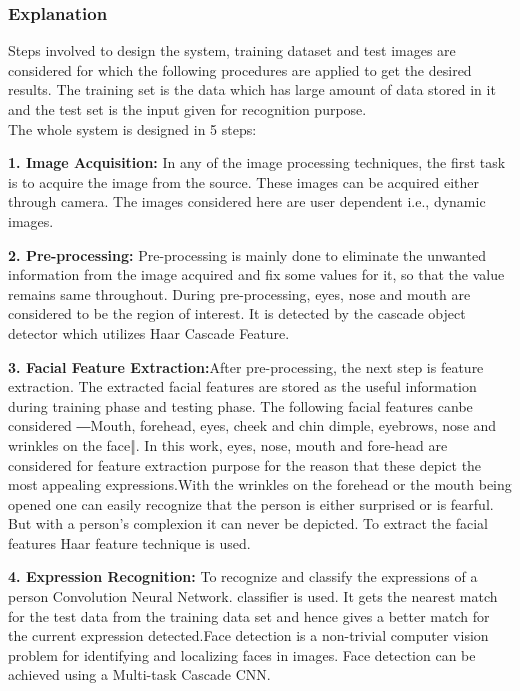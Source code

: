 \documentclass[12pt]{report}
\begin{document}
\subsubsection{Explanation}
\hspace{1.7cm}Steps involved to design the system, training dataset and test images are considered for 
which the following procedures are applied to get the desired results. The training set is 
the data which has large amount of data stored in it and the test set is the input given for
recognition purpose.\\
\hspace{1.7 cm} The whole system is designed in 5 steps:

\textbf{1. Image Acquisition:} In any of the image processing techniques, the first task is to 
acquire the image from the source. These images can be acquired either through
camera. The images considered here are user dependent i.e., dynamic images.

\textbf{2. Pre-processing: } Pre-processing is mainly done to eliminate the unwanted information
from the image acquired and fix some values for it, so that the value remains same 
throughout. During pre-processing, eyes, nose and mouth are considered to be the region of
interest. It is detected by the cascade object detector which utilizes Haar Cascade
Feature.



\textbf{ 3. Facial Feature Extraction:}After pre-processing, the next step is feature extraction. 
The extracted facial features are stored as the useful information during training phase 
and testing phase. The following facial features canbe considered ―Mouth, forehead,
eyes, cheek and chin dimple, eyebrows, nose and wrinkles on the face‖. In this work, 
eyes, nose, mouth and fore-head are considered for feature extraction purpose for the
reason that these depict the most appealing expressions.With the wrinkles on the 
forehead or the mouth being opened one can easily recognize that the person is either 
surprised or is fearful. But with a person’s complexion it can never be depicted. To 
extract the facial features Haar feature technique is used.

\textbf{4. Expression Recognition:} To recognize and classify the expressions of a person
Convolution Neural Network. classifier is used. It gets the nearest match for the test data 
from the training data set and hence gives a better match for the current expression 
detected.Face detection is a non-trivial computer vision problem for identifying and 
localizing faces in images. Face detection can be achieved using 
a Multi-task Cascade CNN.
\end{document}
